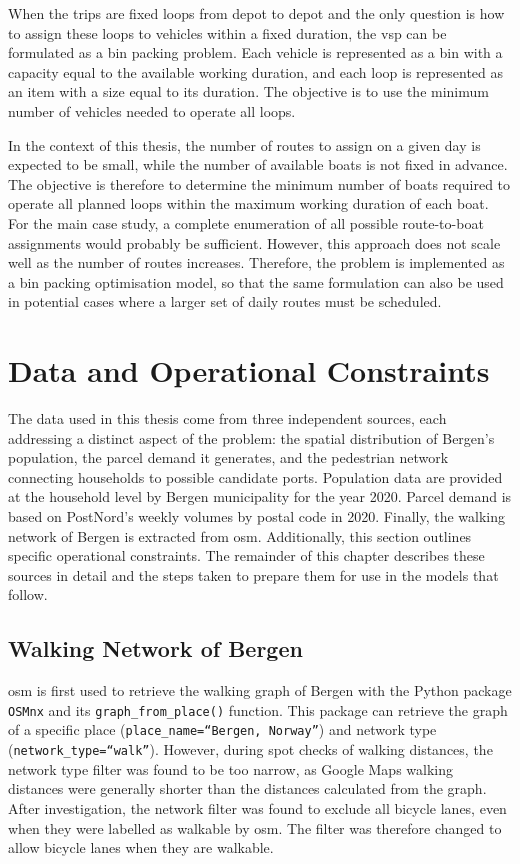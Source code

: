 \documentclass[12pt]{article}
\begin{document}
When the trips are fixed loops from depot to depot and the only question is how to assign these loops to vehicles within a fixed duration, the \ac{vsp} can be formulated as a bin packing problem. Each vehicle is represented as a bin with a capacity equal to the available working duration, and each loop is represented as an item with a size equal to its duration. The objective is to use the minimum number of vehicles needed to operate all loops.

In the context of this thesis, the number of routes to assign on a given day is expected to be small, while the number of available boats is not fixed in advance. The objective is therefore to determine the minimum number of boats required to operate all planned loops within the maximum working duration of each boat. For the main case study, a complete enumeration of all possible route-to-boat assignments would probably be sufficient. However, this approach does not scale well as the number of routes increases. Therefore, the problem is implemented as a bin packing optimisation model, so that the same formulation can also be used in potential cases where a larger set of daily routes must be scheduled.

\section{Data and Operational Constraints}
\label{sec:data}

The data used in this thesis come from three independent sources, each addressing a distinct aspect of the problem: the spatial distribution of Bergen's population, the parcel demand it generates, and the pedestrian network connecting households to possible candidate ports. Population data are provided at the household level by Bergen municipality for the year 2020. Parcel demand is based on PostNord's weekly volumes by postal code in 2020. Finally, the walking network of Bergen is extracted from \ac{osm}. Additionally, this section outlines specific operational constraints. The remainder of this chapter describes these sources in detail and the steps taken to prepare them for use in the models that follow.

\subsection{Walking Network of Bergen}
\label{subsec:walking-network-bergen}

\ac{osm} is first used to retrieve the walking graph of Bergen with the Python package \texttt{OSMnx} \parencite{osmnx} and its \texttt{graph\_from\_place()} function. This package can retrieve the graph of a specific place (\texttt{place\_name=``Bergen, Norway''}) and network type (\texttt{network\_type=``walk''}). However, during spot checks of walking distances, the network type filter was found to be too narrow, as Google Maps walking distances were generally shorter than the distances calculated from the graph. After investigation, the network filter was found to exclude all bicycle lanes, even when they were labelled as walkable by \ac{osm}. The filter was therefore changed to allow bicycle lanes when they are walkable.
\end{document}
